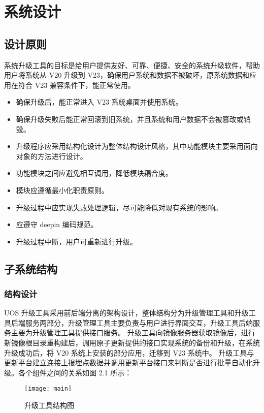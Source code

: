 \documentclass{utart}
\begin{document}
\section{系统设计}
\subsection{设计原则}
系统升级工具的目标是给用户提供友好、可靠、便捷、安全的系统升级软件，帮助用户将系统从 V20 升级到 V23，确保用户系统和数据不被破坏，原系统数据和应用在符合 V23 兼容条件下，能正常使用。
\begin{itemize}
    \item 确保升级后，能正常进入 V23 系统桌面并使用系统。
    \item 确保升级失败后能正常回滚到旧系统，并且系统和用户数据不会被篡改或销毁。
    \item 升级程序应采用结构化设计为整体结构设计风格，其中功能模块主要采用面向对象的方法进行设计。
    \item 功能模块之间应避免相互调用，降低模块耦合度。
    \item 模块应遵循最小化职责原则。
    \item 升级过程中应实现失败处理逻辑，尽可能降低对现有系统的影响。
    \item 应遵守 deepin 编码规范。
    \item 升级过程中断，用户可重新进行升级。
\end{itemize}
\subsection{子系统结构}
\subsubsection{结构设计}
UOS 升级工具采用前后端分离的架构设计，整体结构分为升级管理工具和升级工具后端服务两部分，升级管理工具主要负责与用户进行界面交互，升级工具后端服务主要为升级管理工具提供接口服务。
升级工具向镜像服务器获取镜像后，进行新镜像根目录重构建后，调用原子更新提供的接口实现系统的备份和升级，在系统升级成功后，将 V20 系统上安装的部分应用，迁移到 V23 系统中。
升级工具与更新平台建立连接上报埋点数据并调用更新平台接口来判断是否进行批量自动化升级。各个组件之间的关系如图 2.1 所示：
\begin{figure}[H]
    \centering
    \texttt{[image: main]}
    \caption{升级工具结构图}
    \label{fig:upgradestruct}
\end{figure}
\end{document}
